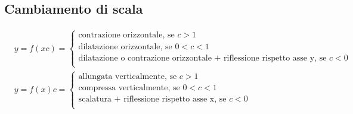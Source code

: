\documentclass{book}
\begin{document}
\begin{definition}
    \subsection{Cambiamento di scala}
    \begin{align*}
         & y=f(xc) = \begin{cases}
                         \text{contrazione orizzontale, se } c > 1                                             \\
                         \text{dilatazione orizzontale, se } 0 < c < 1                                         \\
                         \text{dilatazione o contrazione orizzontale + riflessione rispetto asse y, se } c < 0 \\
                     \end{cases} \\
         & y=f(x)c = \begin{cases}
                         \text{allungata verticalmente, se } c > 1                 \\
                         \text{compressa verticalmente, se } 0 < c < 1             \\
                         \text{scalatura + riflessione rispetto asse x, se } c < 0 \\
                     \end{cases}
    \end{align*}
\end{definition}
\end{document}
